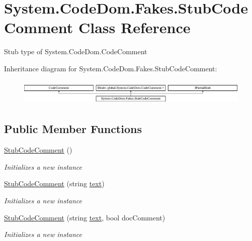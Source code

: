\hypertarget{class_system_1_1_code_dom_1_1_fakes_1_1_stub_code_comment}{\section{System.\-Code\-Dom.\-Fakes.\-Stub\-Code\-Comment Class Reference}
\label{class_system_1_1_code_dom_1_1_fakes_1_1_stub_code_comment}
}


Stub type of System.\-Code\-Dom.\-Code\-Comment 


Inheritance diagram for System.\-Code\-Dom.\-Fakes.\-Stub\-Code\-Comment\-:\begin{figure}[H]
\begin{center}
\leavevmode
\includegraphics[height=1.269841cm]{class_system_1_1_code_dom_1_1_fakes_1_1_stub_code_comment}
\end{center}
\end{figure}
\subsection*{Public Member Functions}
\begin{DoxyCompactItemize}
\item 
\hyperlink{class_system_1_1_code_dom_1_1_fakes_1_1_stub_code_comment_af8ef7c997281a40e9dc01ae3c63ddb38}{Stub\-Code\-Comment} ()
\begin{DoxyCompactList}\small\item\em Initializes a new instance\end{DoxyCompactList}\item 
\hyperlink{class_system_1_1_code_dom_1_1_fakes_1_1_stub_code_comment_a64c3e576f095e4c8a64ed26a877445a2}{Stub\-Code\-Comment} (string \hyperlink{jquery-1_810_82-vsdoc_8js_aa5b77da29631a344064bb3d20c8702de}{text})
\begin{DoxyCompactList}\small\item\em Initializes a new instance\end{DoxyCompactList}\item 
\hyperlink{class_system_1_1_code_dom_1_1_fakes_1_1_stub_code_comment_acc93a79bc04e55bd18322b0bb722f58c}{Stub\-Code\-Comment} (string \hyperlink{jquery-1_810_82-vsdoc_8js_aa5b77da29631a344064bb3d20c8702de}{text}, bool doc\-Comment)
\begin{DoxyCompactList}\small\item\em Initializes a new instance\end{DoxyCompactList}\end{DoxyCompactItemize}
